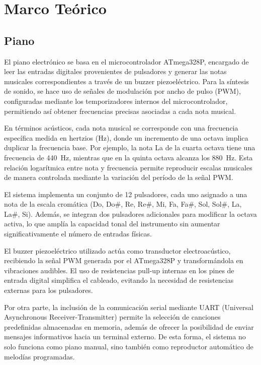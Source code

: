 \section{Marco Teórico}

\subsection{Piano}

El piano electrónico se basa en el microcontrolador ATmega328P, encargado de leer las entradas digitales provenientes de pulsadores y generar las notas musicales correspondientes a través de un buzzer piezoeléctrico. 
Para la síntesis de sonido, se hace uso de señales de modulación por ancho de pulso (PWM), configuradas mediante los temporizadores internos del microcontrolador, permitiendo así obtener frecuencias precisas asociadas a cada nota musical.

En términos acústicos, cada nota musical se corresponde con una frecuencia específica medida en hertzios (Hz), donde un incremento de una octava implica duplicar la frecuencia base. 
Por ejemplo, la nota La de la cuarta octava tiene una frecuencia de 440~Hz, mientras que en la quinta octava alcanza los 880~Hz. 
Esta relación logarítmica entre nota y frecuencia permite reproducir escalas musicales de manera controlada mediante la variación del período de la señal PWM.

El sistema implementa un conjunto de 12 pulsadores, cada uno asignado a una nota de la escala cromática (Do, Do\#, Re, Re\#, Mi, Fa, Fa\#, Sol, Sol\#, La, La\#, Si). 
Además, se integran dos pulsadores adicionales para modificar la octava activa, lo que amplía la capacidad tonal del instrumento sin aumentar significativamente el número de entradas físicas.

El buzzer piezoeléctrico utilizado actúa como transductor electroacústico, recibiendo la señal PWM generada por el ATmega328P y transformándola en vibraciones audibles. 
El uso de resistencias pull-up internas en los pines de entrada digital simplifica el cableado, evitando la necesidad de resistencias externas para los pulsadores.

Por otra parte, la inclusión de la comunicación serial mediante UART (Universal Asynchronous Receiver-Transmitter) permite la selección de canciones predefinidas almacenadas en memoria, 
además de ofrecer la posibilidad de enviar mensajes informativos hacia un terminal externo. 
De esta forma, el sistema no solo funciona como piano manual, sino también como reproductor automático de melodías programadas.

